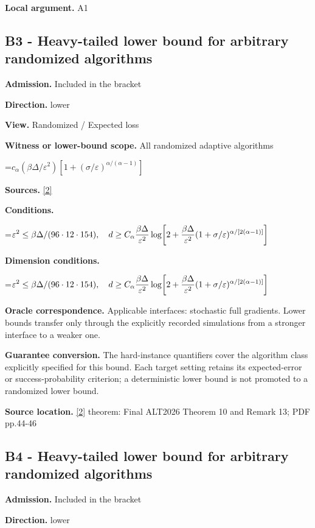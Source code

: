 \documentclass[10pt,a4paper]{article}
\newcommand{\AtlasMath}[1]{\par\begingroup\centering\setbox0=\hbox{$\displaystyle #1$}\ifdim\wd0>1.4\linewidth\typeout{ATLAS WIDE FORMULA: \the\wd0}\fi\ifdim\wd0>\linewidth\resizebox{\linewidth}{!}{\box0}\else\box0\fi\par\endgroup}
\begin{document}
\textbf{Local argument.} A1

\subsection{B3 - Heavy-tailed lower bound for arbitrary randomized algorithms}
\textbf{Admission.} Included in the bracket

\textbf{Direction.} lower

\textbf{View.} Randomized / Expected loss

\textbf{Witness or lower-bound scope.} All randomized adaptive algorithms

\AtlasMath{c_\alpha (\beta\Delta/\varepsilon^2)[1+(\sigma/\varepsilon)^{\alpha/(\alpha-1)}]}
\textbf{Sources.} \href{https://proceedings.mlr.press/v313/liu26a.html}{[2]}

\textbf{Conditions.} 
\AtlasMath{\varepsilon^2\le\beta\Delta/(96\cdot12\cdot154),\quad d\ge C_\alpha {\beta\Delta\over\varepsilon^2}\log\!\left[2+{\beta\Delta\over\varepsilon^2}(1+\sigma/\varepsilon)^{\alpha/[2(\alpha-1)]}\right]}


\textbf{Dimension conditions.} 
\AtlasMath{\varepsilon^2\le\beta\Delta/(96\cdot12\cdot154),\quad d\ge C_\alpha {\beta\Delta\over\varepsilon^2}\log\!\left[2+{\beta\Delta\over\varepsilon^2}(1+\sigma/\varepsilon)^{\alpha/[2(\alpha-1)]}\right]}


\textbf{Oracle correspondence.} Applicable interfaces: stochastic full gradients. Lower bounds transfer only through the explicitly recorded simulations from a stronger interface to a weaker one.

\textbf{Guarantee conversion.} The hard-instance quantifiers cover the algorithm class explicitly specified for this bound. Each target setting retains its expected-error or success-probability criterion; a deterministic lower bound is not promoted to a randomized lower bound.

\textbf{Source location.} \href{https://proceedings.mlr.press/v313/liu26a.html}{[2]} theorem: Final ALT2026 Theorem 10 and Remark 13; PDF pp.44-46

\subsection{B4 - Heavy-tailed lower bound for arbitrary randomized algorithms}
\textbf{Admission.} Included in the bracket

\textbf{Direction.} lower
\end{document}
